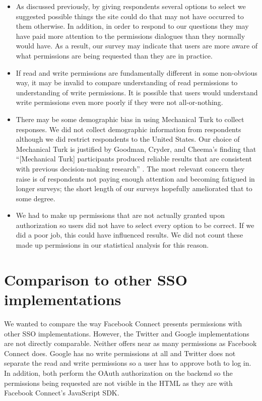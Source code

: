 \documentclass[10pt]{sig-alternate-10pt}
\begin{document}
\begin{itemize}
  \item As discussed previously, by giving respondents several options to select we suggested possible things the site could do that may not have occurred to them otherwise. In addition, in order to respond to our questions they may have paid more attention to the permissions dialogues than they normally would have. As a result, our survey may indicate that users are more aware of what permissions are being requested than they are in practice.
  \item If read and write permissions are fundamentally different in some non-obvious way, it may be invalid to compare understanding of read permissions to understanding of write permissions. It is possible that users would understand write permissions even more poorly if they were not all-or-nothing.
  \item There may be some demographic bias in using Mechanical Turk to collect responses. We did not collect demographic information from respondents although we did restrict respondents to the United States. Our choice of Mechanical Turk is justified by Goodman, Cryder, and Cheema's finding that ``[Mechanical Turk] participants produced reliable results that are consistent with previous decision-making research'' \cite{mturkreliability}. The most relevant concern they raise is of respondents not paying enough attention and becoming fatigued in longer surveys; the short length of our surveys hopefully ameliorated that to some degree.
  \item We had to make up permissions that are not actually granted upon authorization so users did not have to select every option to be correct. If we did a poor job, this could have influenced results. We did not count these made up permissions in our statistical analysis for this reason.
\end{itemize}

\section{Comparison to other SSO implementations}

We wanted to compare the way Facebook Connect presents permissions with other SSO implementations. However, the Twitter \cite{twitterdocs} and Google \cite{googledocs} implementations are not directly comparable. Neither offers near as many permissions as Facebook Connect does. Google has no write permissions at all and Twitter does not separate the read and write permissions so a user has to approve both to log in. In addition, both perform the OAuth authorization on the backend so the permissions being requested are not visible in the HTML as they are with Facebook Connect's JavaScript SDK.
\end{document}

